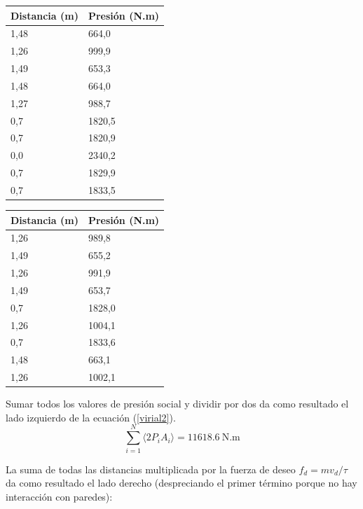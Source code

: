 \begin{center}
\label{my-label}
\begin{tabular}{|l|l|}
\hline
Distancia (m) & Presión (N.m) \\ \hline
1,48          & 664,0       \\ \hline
1,26          & 999,9       \\ \hline
1,49          & 653,3       \\ \hline
1,48          & 664,0       \\ \hline
1,27          & 988,7       \\ \hline
0,7           & 1820,5       \\ \hline
0,7           & 1820,9       \\ \hline
0,0           & 2340,2       \\ \hline
0,7           & 1829,9       \\ \hline
0,7           & 1833,5       \\ \hline
\end{tabular}
\quad
\begin{tabular}{|l|l|}
\hline
Distancia (m) & Presión (N.m) \\ \hline
1,26          & 989,8       \\ \hline
1,49          & 655,2       \\ \hline
1,26          & 991,9       \\ \hline
1,49          & 653,7        \\ \hline
0,7           & 1828,0       \\ \hline
1,26          & 1004,1       \\ \hline
0,7           & 1833,6       \\ \hline
1,48          & 663,1       \\ \hline
1,26          & 1002,1       \\ \hline
\end{tabular}
\end{center}


Sumar todos los valores de presión social y dividir por dos da como resultado el lado izquierdo de la ecuación (\ref{virial2}).
\begin{equation}
 \displaystyle\sum_{i=1}^N\langle2P_iA_i\rangle = 11618.6\ \text{N.m}
\end{equation}

La suma de todas las distancias multiplicada por la fuerza de deseo $f_d=mv_d/\tau$ da como resultado el lado derecho (despreciando el primer término porque no hay interacción con paredes):

